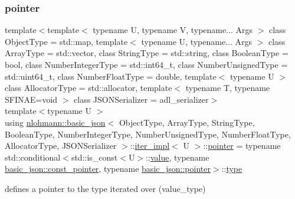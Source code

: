\subsubsection{\texorpdfstring{pointer}{pointer}}
{\footnotesize\ttfamily template$<$template$<$ typename U, typename V, typename... Args $>$ class Object\+Type = std\+::map, template$<$ typename U, typename... Args $>$ class Array\+Type = std\+::vector, class String\+Type  = std\+::string, class Boolean\+Type  = bool, class Number\+Integer\+Type  = std\+::int64\+\_\+t, class Number\+Unsigned\+Type  = std\+::uint64\+\_\+t, class Number\+Float\+Type  = double, template$<$ typename U $>$ class Allocator\+Type = std\+::allocator, template$<$ typename T, typename S\+F\+I\+N\+A\+E=void $>$ class J\+S\+O\+N\+Serializer = adl\+\_\+serializer$>$ \\
template$<$typename U $>$ \\
using \hyperlink{classnlohmann_1_1basic__json}{nlohmann\+::basic\+\_\+json}$<$ Object\+Type, Array\+Type, String\+Type, Boolean\+Type, Number\+Integer\+Type, Number\+Unsigned\+Type, Number\+Float\+Type, Allocator\+Type, J\+S\+O\+N\+Serializer $>$\+::\hyperlink{classnlohmann_1_1basic__json_1_1iter__impl}{iter\+\_\+impl}$<$ U $>$\+::\hyperlink{classnlohmann_1_1basic__json_1_1iter__impl_a3dddd7fa38b36e2531700ceb4a1ce9a8}{pointer} =  typename std\+::conditional$<$std\+::is\+\_\+const$<$U$>$\+::\hyperlink{classnlohmann_1_1basic__json_1_1iter__impl_a92e849ca687355935c02f492be936b68}{value}, typename \hyperlink{classnlohmann_1_1basic__json_aff3d5cd2a75612364b888d8693231b58}{basic\+\_\+json\+::const\+\_\+pointer}, typename \hyperlink{classnlohmann_1_1basic__json_aefee1f777198c68724bd127e0c8abbe4}{basic\+\_\+json\+::pointer}$>$\+::\hyperlink{classnlohmann_1_1basic__json_a2b2d781d7f2a4ee41bc0016e931cadf7}{type}}



defines a pointer to the type iterated over (value\+\_\+type) 

\mbox{\label{classnlohmann_1_1basic__json_1_1iter__impl_ae09599e9cb4a947020a0265c0c4f3d5e}} 

